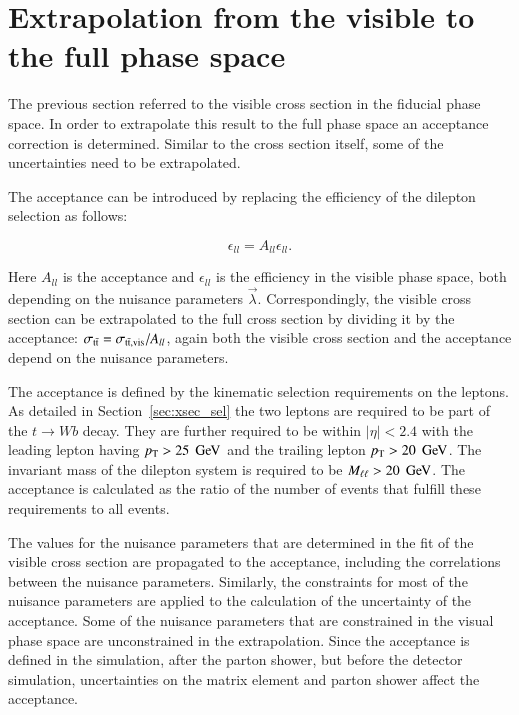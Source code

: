 \section{Extrapolation from the visible to the full phase space}
\label{sec:xsec_extraction}

The previous section referred to the visible cross section in the fiducial phase space. In order to extrapolate this result to the full phase space an acceptance correction 
is determined.
Similar to the cross section itself, some of the uncertainties need to be extrapolated.

The acceptance can be introduced by replacing the efficiency of the dilepton selection as follows:

\begin{equation}
\epsilon_{ll} = A_{ll} \epsilon_{ll}.
\label{eq:epsacc}
\end{equation}

Here $A_{ll}$ is the acceptance and $\epsilon_{ll}$ is the efficiency in the visible phase space, both depending on the nuisance parameters $\vec{\lambda}$.
Correspondingly, the visible cross section can be extrapolated to the full cross section by dividing it by the acceptance: $\sigma_{\mathrm{t}\bar{\mathrm{t}}} = \sigma_{\mathrm{t}\bar{\mathrm{t}},\mathrm{vis}} / A_{ll}$, again both the visible cross section and the 
acceptance depend on the nuisance parameters.

The acceptance is defined by the kinematic selection requirements on the leptons. As detailed in Section~\ref{sec:xsec_sel} the two leptons are required to be part of the $t \rightarrow W b$ decay. They are further required to be within $|\eta|< 2.4$ with the 
leading lepton having $p_{\mathrm{T}} > 25 \; \,\text{Ge\hspace{-.08em}V}$ and the trailing lepton $p_{\mathrm{T}} > 20 \; \,\text{Ge\hspace{-.08em}V}$. The invariant mass of the dilepton system is required to be $M_{\ell\ell} > 20 \; \,\text{Ge\hspace{-.08em}V}$. The acceptance is calculated as the ratio of the number of \ttbar events that fulfill these requirements to all \ttbar events.

The values for the nuisance parameters that are determined in the fit of the visible cross section are propagated to the acceptance, including the correlations between the nuisance parameters. 
Similarly, the constraints for most of the nuisance parameters are applied to the calculation of the uncertainty of the acceptance.
Some of the nuisance parameters that are constrained in the visual phase space are unconstrained in the extrapolation.
Since the acceptance is defined in the simulation, after the parton shower, but before the detector simulation, uncertainties on the 
matrix element and parton shower affect the acceptance.

